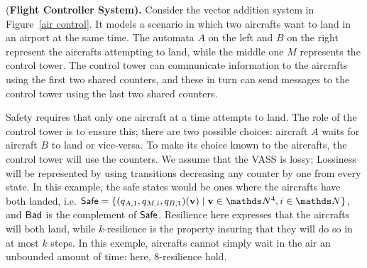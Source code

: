 \begin{example}\label{Example}
{(\bf Flight Controller System).}
Consider the vector addition system in Figure~\ref{air control}. It models a scenario in which two aircrafts want to land in an airport at the same time. 
The automata $A$ on the left and $B$ on the right represent the aircrafts attempting to land, while the middle one $M$ represents the control tower. The control tower can communicate information to the aircrafts using 
the first two shared counters, and these in turn can send messages to the control tower
using the last two shared counters. 

Safety requires that only one aircraft at a time attempts to land. The role of the control tower is to ensure this;
there are two possible choices: aircraft $A$ waits for aircraft $B$ to land
or vice-versa. To make its choice known to the aircrafts, the control tower will use the counters. 
We assume that the VASS is
lossy;  Lossiness will be represented by using transitions decreasing any counter by one from every state.
In this example, the safe states would be ones where the aircrafts have both landed, i.e.
$\Safe = \{(q_{A,1}, q_{M,i}, q_{B,1})(\textbf{v}) \mid \textbf{v} \in \N^4, i \in \N\}$, and $\textsf{Bad}$ is the complement of $\textsf{Safe}$. 
Resilience here expresses that the aircrafts will both land, while $k$-resilience is the property insuring that they will do so in at most $k$ steps. 
In this exemple, aircrafts cannot simply wait in the air an unbounded amount of time: here, $8$-resilience hold.
\end{example}




